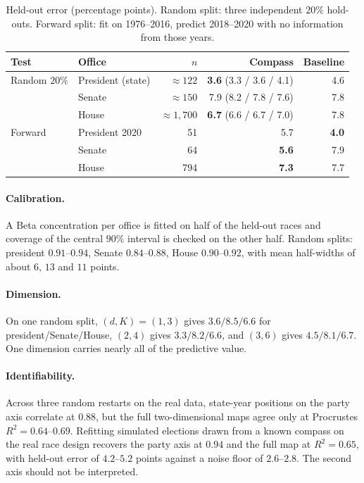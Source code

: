 \documentclass[11pt]{article}
\begin{document}
\begin{table}[H]\centering
\caption{Held-out error (percentage points). Random split: three independent $20\%$ hold-outs. Forward split: fit on 1976--2016, predict 2018--2020 with no information from those years.}
\begin{tabular}{llrrr}
\toprule
Test & Office & $n$ & Compass & Baseline \\
\midrule
Random $20\%$ & President (state) & $\approx122$ & \textbf{3.6} (3.3 / 3.6 / 4.1) & 4.6 \\
 & Senate & $\approx150$ & 7.9 (8.2 / 7.8 / 7.6) & 7.8 \\
 & House & $\approx1{,}700$ & \textbf{6.7} (6.6 / 6.7 / 7.0) & 7.8 \\
\midrule
Forward & President 2020 & 51 & 5.7 & \textbf{4.0} \\
 & Senate & 64 & \textbf{5.6} & 7.9 \\
 & House & 794 & \textbf{7.3} & 7.7 \\
\bottomrule
\end{tabular}
\end{table}

\paragraph{Calibration.} A Beta concentration per office is fitted on half of the held-out races and coverage of the central $90\%$ interval is checked on the other half. Random splits: president $0.91$--$0.94$, Senate $0.84$--$0.88$, House $0.90$--$0.92$, with mean half-widths of about $6$, $13$ and $11$ points.

\paragraph{Dimension.} On one random split, $(d,K)=(1,3)$ gives $3.6/8.5/6.6$ for president/Senate/House, $(2,4)$ gives $3.3/8.2/6.6$, and $(3,6)$ gives $4.5/8.1/6.7$. One dimension carries nearly all of the predictive value.

\paragraph{Identifiability.} Across three random restarts on the real data, state-year positions on the party axis correlate at $0.88$, but the full two-dimensional maps agree only at Procrustes $R^2 = 0.64$--$0.69$. Refitting simulated elections drawn from a known compass on the real race design recovers the party axis at $0.94$ and the full map at $R^2=0.65$, with held-out error of $4.2$--$5.2$ points against a noise floor of $2.6$--$2.8$. The second axis should not be interpreted.
\end{document}
